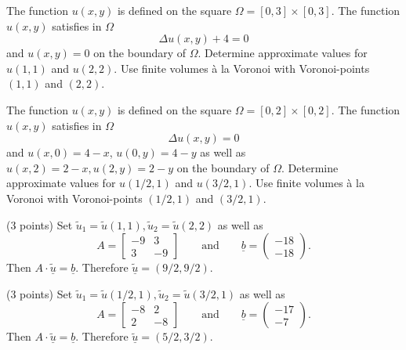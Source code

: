 \begin{teilaufgaben}
\item
The function $u(x,y)$ is defined on the square $\Omega = [0,3] \times [0,3]$.
The function $u(x,y)$ satisfies in $\Omega$ 
\[
\Delta u(x,y) + 4 = 0
\]
and $u(x,y) = 0$ on the boundary of $\Omega$.
Determine approximate values for $u(1,1)$ and $u(2,2)$. 
Use finite volumes \`a la Voronoi with Voronoi-points $(1,1)$ and $(2,2)$.  
\item
The function $u(x,y)$ is defined on the square $\Omega = [0,2] \times [0,2]$.
The function $u(x,y)$ satisfies in $\Omega$ 
\[
\Delta u(x,y) = 0
\]
and $u(x,0) = 4 - x$, $u(0,y) = 4 - y$ as well as
$u(x,2) = 2 - x, u(2,y) = 2 - y$  on the boundary of $\Omega$.
Determine approximate values for $u(1/2,1)$ and $u(3/2,1)$.  
Use finite volumes \`a la Voronoi with Voronoi-points $(1/2,1)$ and $(3/2,1)$.    
\end{teilaufgaben}

\begin{loesung}
\begin{teilaufgaben}
\item
(3 points) Set $\tilde u_1 = \tilde u(1,1), \tilde u_2 = \tilde u(2,2)$
as well as
\[
A = \left[\begin{array}{rr} - 9 & 3  \\ 3 & - 9  \end{array}\right]
\qquad\text{and}\qquad
\underline{b}
=
\left(\begin{array}{r} -18 \\ -18 \end{array}\right).
\]
Then $A \cdot \underline{\tilde u} = \underline{b}$.
Therefore $\underline{\tilde u} = (9/2,9/2)$.
\item
(3 points) Set $\tilde u_1 = \tilde u(1/2,1), \tilde u_2 = \tilde u(3/2,1)$
as well as
\[
A = \left[\begin{array}{rr} -8 & 2  \\ 2 & -8  \end{array}\right]
\qquad\text{and}\qquad
\underline{b}
=
\left(\begin{array}{r} -17 \\ -7 \end{array}\right).
\]
Then $A \cdot \underline{\tilde u} = \underline{b}$.
Therefore $\underline{\tilde u} = (5/2,3/2)$.
\qedhere
\end{teilaufgaben}
\end{loesung}
